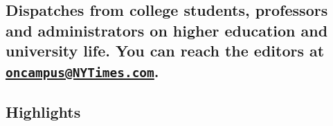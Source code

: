 \hypertarget{dispatches-from-college-students-professors-and-administrators-on-higher-education-and-university-life-you-can-reach-the-editors-at-oncampusnytimescom-1}{%
\subsection{\texorpdfstring{Dispatches from college students, professors
and administrators on higher education and university life. You can
reach the editors at
\href{mailto:oncampus@NYTimes.com}{\nolinkurl{oncampus@NYTimes.com}}.}{Dispatches from college students, professors and administrators on higher education and university life. You can reach the editors at oncampus@NYTimes.com.}}\label{dispatches-from-college-students-professors-and-administrators-on-higher-education-and-university-life-you-can-reach-the-editors-at-oncampusnytimescom-1}}

\hypertarget{highlights}{%
\subsection{Highlights}\label{highlights}}


